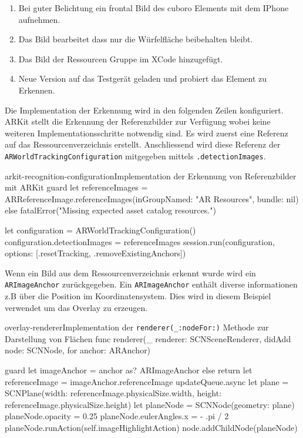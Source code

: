 \begin{description}
	\begin{enumerate}
		\item Bei guter Belichtung ein frontal Bild des cuboro Elements mit dem IPhone aufnehmen. 
		\item Das Bild bearbeitet dass nur die Würfelfläche beibehalten bleibt.
		\item Das Bild der Ressourcen Gruppe im XCode hinzugefügt.
		\item Neue Version auf das Testgerät geladen und probiert das Element zu Erkennen.  
	\end{enumerate}



	Die Implementation der Erkennung wird in den folgenden Zeilen konfiguriert. ARKit stellt die Erkennung der Referenzbilder zur Verfügung wobei keine weiteren Implementationsschritte notwendig sind. Es wird zuerst eine Referenz auf das Ressourcenverzeichnis erstellt. Anschliessend wird diese Referenz der \texttt{ARWorldTrackingConfiguration} mitgegeben mittels \texttt{.detectionImages}.
	\begin{code}{arkit-recognition-configuration}{Implementation der Erkennung von Referenzbilder mit ARKit}
	guard let referenceImages = ARReferenceImage.referenceImages(inGroupNamed: "AR Resources", bundle: nil) else {
		fatalError("Missing expected asset catalog resources.")
	}
	
	let configuration = ARWorldTrackingConfiguration()
	configuration.detectionImages = referenceImages
	session.run(configuration, options: [.resetTracking, .removeExistingAnchors])
	\end{code}

	Wenn ein Bild aus dem Ressourcenverzeichnis erkennt wurde wird ein \texttt{ARImageAnchor} zurückgegeben. Ein \texttt{ARImageAnchor} enthält diverse informationen z.B über die Position im Koordinatensystem. Dies wird in diesem Beispiel verwendet um das Overlay zu erzeugen. 
	\begin{code}{overlay-renderer}{Implementation der \texttt{renderer(\_:nodeFor:)} Methode zur Darstellung von Flächen}
		func renderer(_ renderer: SCNSceneRenderer, didAdd node: SCNNode, for anchor: ARAnchor) {
			guard let imageAnchor = anchor as? ARImageAnchor else { return }
			let referenceImage = imageAnchor.referenceImage
			updateQueue.async {
				let plane = SCNPlane(width: referenceImage.physicalSize.width,
									height: referenceImage.physicalSize.height)
				let planeNode = SCNNode(geometry: plane)
				planeNode.opacity = 0.25
				planeNode.eulerAngles.x =  - .pi / 2
				planeNode.runAction(self.imageHighlightAction)
				node.addChildNode(planeNode)
			}

}
\end{code}
\end{description}
